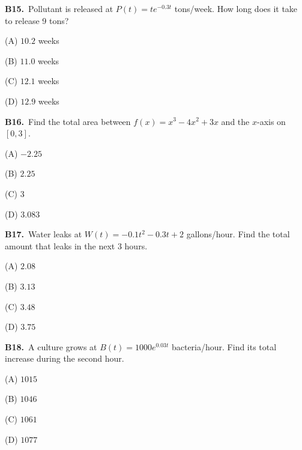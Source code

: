 \documentclass[11pt]{article}
\begin{document}
\bigskip\noindent\textbf{B15.}\ Pollutant is released at $P(t)=te^{-0.3t}$ tons/week. How long does it take to release 9 tons?
\begin{list}{}{\setlength{\leftmargin}{3em}\setlength{\labelwidth}{2.5em}\setlength{\itemsep}{0pt}\setlength{\topsep}{2pt}}
\item[(A)] $10.2$ weeks
\item[(B)] $11.0$ weeks
\item[(C)] $12.1$ weeks
\item[(D)] $12.9$ weeks
\end{list}

\bigskip\noindent\textbf{B16.}\ Find the total area between $f(x)=x^3-4x^2+3x$ and the $x$-axis on $[0,3]$.
\begin{list}{}{\setlength{\leftmargin}{3em}\setlength{\labelwidth}{2.5em}\setlength{\itemsep}{0pt}\setlength{\topsep}{2pt}}
\item[(A)] $-2.25$
\item[(B)] $2.25$
\item[(C)] $3$
\item[(D)] $3.083$
\end{list}

\bigskip\noindent\textbf{B17.}\ Water leaks at $W(t)=-0.1t^2-0.3t+2$ gallons/hour. Find the total amount that leaks in the next 3 hours.
\begin{list}{}{\setlength{\leftmargin}{3em}\setlength{\labelwidth}{2.5em}\setlength{\itemsep}{0pt}\setlength{\topsep}{2pt}}
\item[(A)] $2.08$
\item[(B)] $3.13$
\item[(C)] $3.48$
\item[(D)] $3.75$
\end{list}

\bigskip\noindent\textbf{B18.}\ A culture grows at $B(t)=1000e^{0.03t}$ bacteria/hour. Find its total increase during the second hour.
\begin{list}{}{\setlength{\leftmargin}{3em}\setlength{\labelwidth}{2.5em}\setlength{\itemsep}{0pt}\setlength{\topsep}{2pt}}
\item[(A)] $1015$
\item[(B)] $1046$
\item[(C)] $1061$
\item[(D)] $1077$
\end{list}
\end{document}
